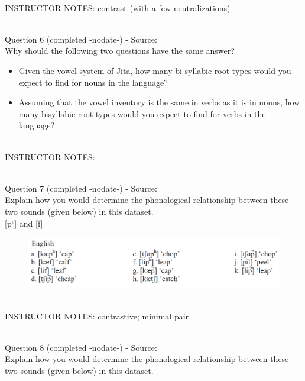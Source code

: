\documentclass[12pt]{article}
\begin{document}
~\\
INSTRUCTOR NOTES: contrast (with a few neutralizations)


~\\

{\large Question 6} (completed -nodate-) - Source: \\

Why should the following two questions have the same answer?\\

\begin{itemize} \item Given the vowel system of Jita, how many bi-syllabic root types would you expect to find for nouns in the language? \item Assuming that the vowel inventory is the same in verbs as it is in nouns, how many bisyllabic root types would you expect to find for verbs in the language? \end{itemize}


~\\
INSTRUCTOR NOTES: 


~\\

{\large Question 7} (completed -nodate-) - Source: \\

Explain how you would determine the phonological relationship between these two sounds (given below) in this dataset.\\

{[pʰ]} and {[f]}

\begin{figure}[H]
\includegraphics{../images/english_labials.png}
\end{figure}

~\\
INSTRUCTOR NOTES: contrastive; minimal pair


~\\

{\large Question 8} (completed -nodate-) - Source: \\

Explain how you would determine the phonological relationship between these two sounds (given below) in this dataset.\\
\end{document}
